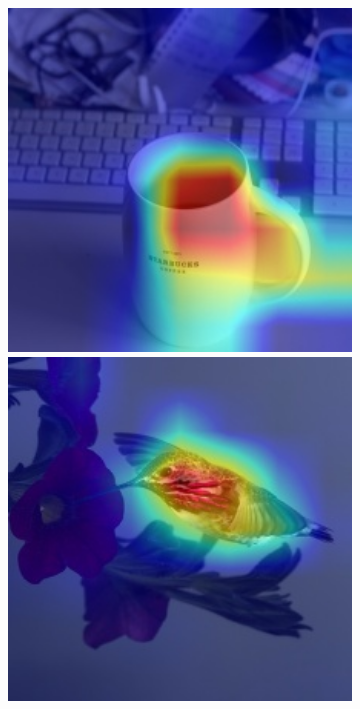 \begin{figure}[t]
\begin{subfigure}[b]{0.19\textwidth}
        \includegraphics[width=1\textwidth]{figures/qualitative_results/ILSVRC2012_val_00016576_poolformer_s24.JPEG}
        \includegraphics[width=1\textwidth]{figures/qualitative_results/ILSVRC2012_val_00005779_poolformer_s24.JPEG}

\end{subfigure}
\end{figure}
